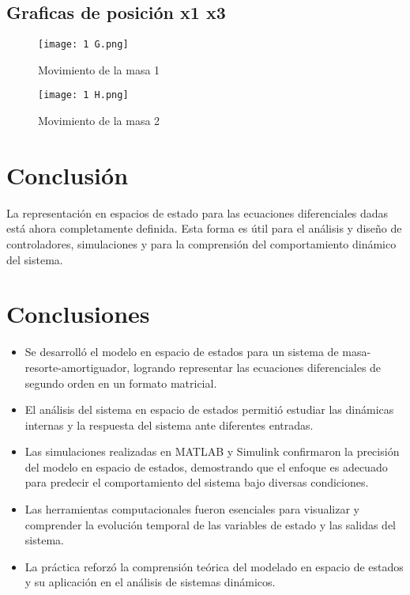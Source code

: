 \documentclass{report}
\begin{document}
\subsection{Graficas de posición x1  x3}

\begin{figure}[H]
    \centering
    \texttt{[image: 1 G.png]}
    \caption{Movimiento de la masa 1}
    \label{fig:diagrama_modelo}
\end{figure}

\begin{figure}[H]
    \centering
    \texttt{[image: 1 H.png]}
    \caption{Movimiento de la masa 2}
    \label{fig:diagrama_modelo}
\end{figure}

\section{Conclusión}

La representación en espacios de estado para las ecuaciones diferenciales dadas está ahora completamente definida. Esta forma es útil para el análisis y diseño de controladores, simulaciones y para la comprensión del comportamiento dinámico del sistema.




\section{Conclusiones}
\begin{itemize}
    \item Se desarrolló el modelo en espacio de estados para un sistema de masa-resorte-amortiguador, logrando representar las ecuaciones diferenciales de segundo orden en un formato matricial.
    \item El análisis del sistema en espacio de estados permitió estudiar las dinámicas internas y la respuesta del sistema ante diferentes entradas.
    \item Las simulaciones realizadas en MATLAB y Simulink confirmaron la precisión del modelo en espacio de estados, demostrando que el enfoque es adecuado para predecir el comportamiento del sistema bajo diversas condiciones.
    \item Las herramientas computacionales fueron esenciales para visualizar y comprender la evolución temporal de las variables de estado y las salidas del sistema.
    \item La práctica reforzó la comprensión teórica del modelado en espacio de estados y su aplicación en el análisis de sistemas dinámicos.
\end{itemize}
\end{document}
